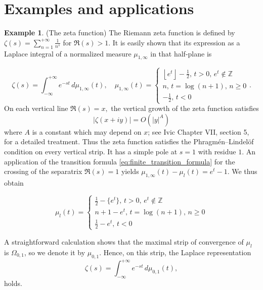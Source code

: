 \documentclass[12pt]{article}
\theoremstyle{definition}
\newtheorem{example}[theorem]{Example}
\newcommand{\floor}[1]{\left\lfloor #1 \right\rfloor}
\begin{document}
\section{Examples and applications}
\label{sec_applications}
\begin{example}{(The zeta function)}
\label{ex_zeta_function}
The  Riemann zeta function is defined by \( \zeta(s)= \sum_{n=1}^{+ \infty} \frac{1}{n^s}\) for $\Re(s)>1$. It is easily shown that its expression  as a Laplace integral of a normalized measure $\mu_{1, \infty}$ in that half-plane is 

\begin{equation}\label{eq:zetamu}
    \zeta(s)= \int_{-\infty}^{+ \infty}e^{-st}\,d\mu_{1, \infty}(t), \quad \mu_{1, \infty}(t)= \begin{cases}
        \floor{e^t}-\frac{1}{2}, \, t>0, \, e^t \notin \mathbb{Z} \\
        n, \, t= \log(n+1), \, n\geq 0 \\
        -\frac{1}{2}, \, t < 0
    \end{cases}.
\end{equation}
On each vertical line $\Re(s)=x,$ the vertical growth of the zeta function satisfies \begin{equation}\label{eq:zetagrowth}
    |\zeta(x+iy)| = O(|y|^A)
\end{equation} where $A$ is a constant which may depend on $x$; see Ivic \cite{Ivic} Chapter VII, section 5, for a detailed treatment. Thus the zeta function satisfies the Phragmén--Lindelöf condition on every vertical strip. It has a simple pole at $s=1$ with residue $1.$ An application of the transition formula \eqref{eq:finite_transition_formula} for the  crossing of the separatrix $\Re(s)=1$ yields \(\mu_{1, \infty}(t)- \mu_l(t)= e^t-1\). We thus obtain 

\begin{equation*}\label{eq:mul}
    \mu_l(t)= \begin{cases}
        \frac{1}{2}- \{e^t\}, \, t>0, \, e^t \notin \mathbb{Z} \\
        n+1-e^t, \, t= \log(n+1), \, n\geq 0 \\
        \frac{1}{2}-e^t, \, t < 0
    \end{cases}
\end{equation*}

A straightforward calculation shows that the maximal strip of convergence of $\mu_l$ is $\Omega_{0,1}$, so we denote it by $\mu_{0,1}$.  
Hence, on this strip, the Laplace representation
\begin{equation}\label{eq:zeroone}
\zeta(s)=\int_{-\infty}^{+ \infty}e^{-st} \,d\mu_{0,1}(t),
\end{equation} 
holds.


\end{example}
\end{document}
